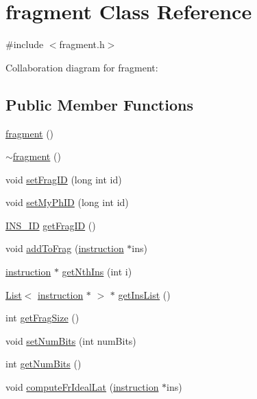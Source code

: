 \hypertarget{classfragment}{
\section{fragment Class Reference}
\label{classfragment}
}


{\ttfamily \#include $<$fragment.h$>$}



Collaboration diagram for fragment:
\subsection*{Public Member Functions}
\begin{DoxyCompactItemize}
\item 
\hyperlink{classfragment_a4d2571d9d7d4a6c63a1104f80b93c459}{fragment} ()
\item 
\hyperlink{classfragment_a64e398a019d40e5876b1f6d949debb62}{$\sim$fragment} ()
\item 
void \hyperlink{classfragment_a576105bce7818f0ec6fc7cc32c36727a}{setFragID} (long int id)
\item 
void \hyperlink{classfragment_ac13cdd18e40da61acc3b7e36c4772c88}{setMyPhID} (long int id)
\item 
\hyperlink{global_2global_8h_a1883c47d0023d0f200e1d86eced6a070}{INS\_\-ID} \hyperlink{classfragment_a384635ae9d4415bb76246355bbd53e87}{getFragID} ()
\item 
void \hyperlink{classfragment_a536afae1860d52f35d230572958c5a48}{addToFrag} (\hyperlink{classinstruction}{instruction} $\ast$ins)
\item 
\hyperlink{classinstruction}{instruction} $\ast$ \hyperlink{classfragment_abad5ebb5003e717717832818787a0fce}{getNthIns} (int i)
\item 
\hyperlink{classList}{List}$<$ \hyperlink{classinstruction}{instruction} $\ast$ $>$ $\ast$ \hyperlink{classfragment_a9347b7f348f9d7844f8367eb6d331906}{getInsList} ()
\item 
int \hyperlink{classfragment_ad6928ee70f8db4c3081b1322103647cd}{getFragSize} ()
\item 
void \hyperlink{classfragment_abee934c501a60519bc610cd01208480f}{setNumBits} (int numBits)
\item 
int \hyperlink{classfragment_a33cff43f87509017ab6b5a5fbf954820}{getNumBits} ()
\item 
void \hyperlink{classfragment_a6082d6576975ec4166aedf50e3db8143}{computeFrIdealLat} (\hyperlink{classinstruction}{instruction} $\ast$ins)
\item 

\end{DoxyCompactItemize}
